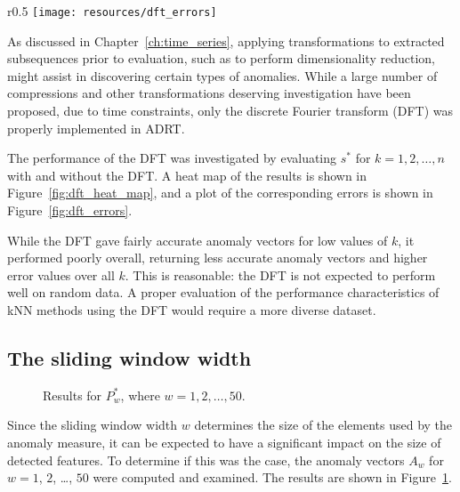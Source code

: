 \begin{wrapfigure}{r}{0.5\textwidth}
\changecaptionwidth
{}
\texttt{[image: resources/dft\_errors]}
\caption{\small{Errors of the $A_{k, t}$.}}
\label{fig:dft_errors}
\end{wrapfigure}

As discussed in Chapter~\ref{ch:time_series}, applying transformations to extracted subsequences prior to evaluation, such as to perform dimensionality reduction, might assist in discovering certain types of anomalies. While a large number of compressions and other transformations deserving investigation have been proposed, due to time constraints, only the discrete Fourier transform (DFT) was properly implemented in ADRT.

The performance of the DFT was investigated by evaluating $s^*$ for $k = 1,2,\dots, n$ with and without the DFT\@. A heat map of the results is shown in Figure~\ref{fig:dft_heat_map}, and a plot of the corresponding errors is shown in Figure~\ref{fig:dft_errors}.

While the DFT gave fairly accurate anomaly vectors for low values of $k$, it performed poorly overall, returning less accurate anomaly vectors and higher error values over all $k$. This is reasonable: the DFT is not expected to perform well on random data. A proper evaluation of the performance characteristics of kNN methods using the DFT would require a more diverse dataset.

\subsection{The sliding window width}
\label{sect:w}

\begin{figure}
    \centering
    \caption{Results for $P^*_w$, where $w = 1, 2, \dots, 50$.}
\label{fig:w_plot}
\end{figure}

Since the sliding window width $w$ determines the size of the elements used by the anomaly measure, it can be expected to have a significant impact on the size of detected features. To determine if this was the case, the anomaly vectors $A_w$ for $w = 1$, $2$, \dots, $50$ were computed and examined. The results are shown in Figure~\ref{fig:w_plot}.


